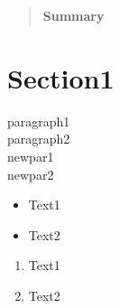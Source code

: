 \documentclass[14pt]{article}
\begin{document}
	\maketitle
	\begin{abstract}
		\vspace{3in}
		\begin{center}
			\textbf{Summary}
		\end{center}
%		
	\end{abstract}
	\section{Section1}
	paragraph1\\
	paragraph2\\
	\newpage
	newpar1\\
	newpar2\\
	
	\begin{itemize}
		\item Text1
		\item Text2
	\end{itemize}
	\begin{enumerate}
		\item Text1
		\item Text2
	\end{enumerate}
	
\end{document}
